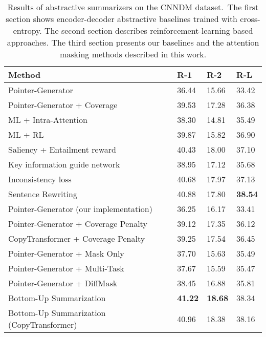 \documentclass[11pt,a4paper]{article}
\begin{document}
\begin{table*}[t]
\centering
{}
\begin{tabular}{@{}llll@{}}
\toprule
Method 				            & R-1 & R-2 & R-L \\ \midrule


Pointer-Generator \citep{see2017get}           & 36.44 & 15.66 & 33.42 \\
Pointer-Generator + Coverage \citep{see2017get} & 39.53 & 17.28 & 36.38 \\
ML + Intra-Attention \citep{paulus2017deep}   & 38.30 & 14.81 & 35.49 \\ \midrule
ML + RL \citep{paulus2017deep}      & 39.87 & 15.82 & 36.90 \\
Saliency + Entailment reward \citep{pasunuru2018multi}  & 40.43 & 18.00 & 37.10 \\
Key information guide network \citep{li2018guiding}  & 38.95 & 17.12 & 35.68 \\
Inconsistency loss \citep{hsu2018unified}    & 40.68 & 17.97 & 37.13 \\
Sentence Rewriting \citep{chen2018fast}  & 40.88 & 17.80 & \textbf{38.54} \\\midrule
Pointer-Generator (our implementation)       & 36.25 & 16.17 & 33.41 \\
Pointer-Generator + Coverage Penalty & 39.12 & 17.35 & 36.12 \\  
CopyTransformer + Coverage Penalty & 39.25 & 17.54 & 36.45 \\  
Pointer-Generator + Mask Only                       & 37.70 & 15.63 & 35.49 \\
Pointer-Generator + Multi-Task                      & 37.67 & 15.59 & 35.47 \\
Pointer-Generator + DiffMask                       & 38.45 & 16.88 & 35.81 \\ 
Bottom-Up Summarization & \textbf{41.22} & \textbf{18.68} & 38.34 \\
Bottom-Up Summarization (CopyTransformer) & 40.96 & 18.38 &  38.16 \\ \bottomrule
\end{tabular}
\caption[Caption for LOF]{Results of abstractive summarizers on the \gls{CNNDM} dataset.\protect\footnotemark ~The first section shows encoder-decoder abstractive baselines trained with cross-entropy. The second section describes reinforcement-learning based approaches. The third section presents our baselines and the attention masking methods described in this work. }
\label{tab:abs}
\end{table*}
\end{document}
